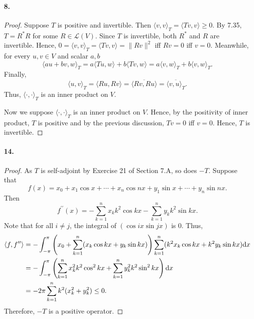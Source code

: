   \paragraph{8.}
  \begin{proof}
    Suppose $T$ is positive and invertible. Then $\langle v,v\rangle_T=\langle
    Tv,v\rangle\ge 0$. By 7.35, $T=R^*R$ for some $R\in\mathcal{L}(V)$. Since
    $T$ is invertible, both $R^*$ and $R$ are invertible. Hence, $0=\langle v,v
    \rangle_T=\langle Tv,v\rangle=\|Rv\|^2$ iff $Rv=0$ iff $v=0$. Meanwhile,
    for every $u,v\in V$ and scalar $a,b$
    \[
      \langle au+bv,w\rangle_T = a\langle Tu,w\rangle + b\langle Tv,w\rangle = 
      a\langle v,w\rangle_T + b\langle v,w\rangle_T.
    \]
    Finally, 
    \[
      \langle u,v\rangle_T = \langle Ru,Rv\rangle = 
      \overline{\langle Rv,Ru\rangle} = \overline{\langle v,u\rangle_T}.
    \]
    Thus, $\langle\cdot,\cdot\rangle_T$ is an inner product on $V$.\par
    Now we suppose $\langle\cdot,\cdot\rangle_T$ is an inner product on $V$.
    Hence, by the positivity of inner product, $T$ is positive and by the 
    previous discussion, $Tv=0$ iff $v=0$. Hence, $T$ is invertible.
  \end{proof}

  \paragraph{14.}
  \begin{proof}
    As $T$ is self-adjoint by Exercise 21 of Section 7.A, so does $-T$.
    Suppose that
    \[
      f(x)=x_0 + x_1\cos x +\cdots+ x_n\cos nx + y_1\sin x +\cdots+ y_n\sin nx.
    \]
    Then
    \[
      f^{\prime\prime}(x)
      = -\sum_{k=1}^nx_kk^2\cos kx - \sum_{k=1}^ny_kk^2\sin kx.
    \]
    Note that for all $i\ne j$, the integral of $(\cos ix\sin jx)$ is $0$. Thus,
    \begin{align*}
      \langle f,f^{\prime\prime}\rangle &= 
      -\int_{-\pi}^\pi
      \left(x_0 + \sum_{k=1}^n(x_k\cos kx + y_k\sin kx) \right)
      \sum_{k=1}^n(k^2x_k\cos kx+ k^2y_k\sin kx)\mathrm{d} x\\
      &= -\int_{-\pi}^\pi\left( \sum_{k=1}^n x_k^2k^2\cos^2kx +
      \sum_{k=1}^ny_k^2k^2\sin^2kx \right)\mathrm{d} x \\
      &= -2\pi\sum_{k=1}^n k^2(x_k^2+y_k^2) \le 0.
    \end{align*}
    Therefore, $-T$ is a positive operator.
  \end{proof}
